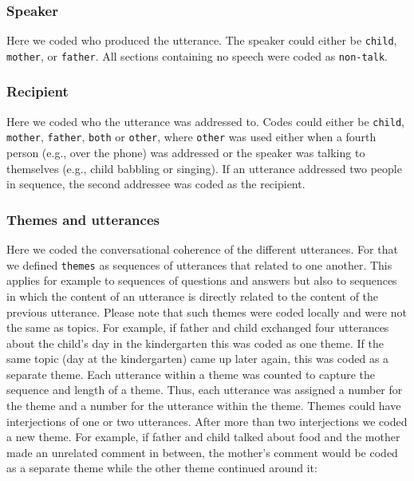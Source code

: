 \documentclass[
  man,floatsintext]{apa6}
\begin{document}
\hypertarget{speaker}{%
\subsubsection{Speaker}\label{speaker}}

Here we coded who produced the utterance. The speaker could either be \texttt{child}, \texttt{mother}, or \texttt{father}. All sections containing no speech were coded as \texttt{non-talk}.

\hypertarget{recipient}{%
\subsubsection{Recipient}\label{recipient}}

Here we coded who the utterance was addressed to. Codes could either be \texttt{child}, \texttt{mother}, \texttt{father}, \texttt{both} or \texttt{other}, where \texttt{other} was used either when a fourth person (e.g., over the phone) was addressed or the speaker was talking to themselves (e.g., child babbling or singing). If an utterance addressed two people in sequence, the second addressee was coded as the recipient.

\hypertarget{themes-and-utterances}{%
\subsubsection{Themes and utterances}\label{themes-and-utterances}}

Here we coded the conversational coherence of the different utterances. For that we defined \texttt{themes} as sequences of utterances that related to one another. This applies for example to sequences of questions and answers but also to sequences in which the content of an utterance is directly related to the content of the previous utterance. Please note that such themes were coded locally and were not the same as topics. For example, if father and child exchanged four utterances about the child's day in the kindergarten this was coded as one theme. If the same topic (day at the kindergarten) came up later again, this was coded as a separate theme. Each utterance within a theme was counted to capture the sequence and length of a theme. Thus, each utterance was assigned a number for the theme and a number for the utterance within the theme. Themes could have interjections of one or two utterances. After more than two interjections we coded a new theme. For example, if father and child talked about food and the mother made an unrelated comment in between, the mother's comment would be coded as a separate theme while the other theme continued around it:
\end{document}
